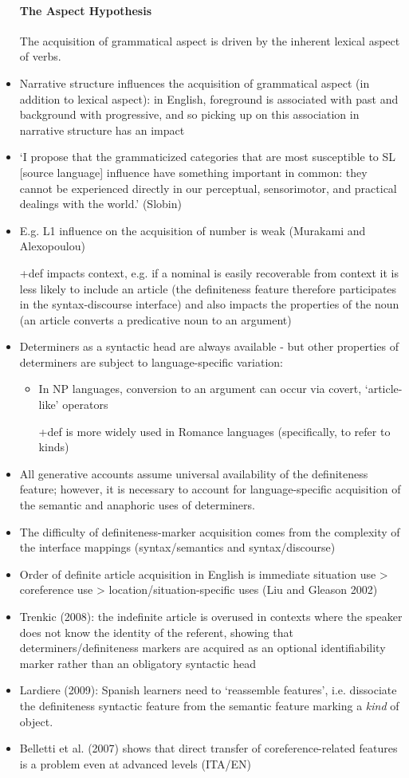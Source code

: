 \documentclass{article}
\begin{document}
\begin{itemize}
    \paragraph{The Aspect Hypothesis} The acquisition of grammatical aspect is driven by the inherent lexical aspect of verbs.
    \item Narrative structure influences the acquisition of grammatical aspect (in addition to lexical aspect): in English, foreground is associated with past and background with progressive, and so picking up on this association in narrative structure has an impact
    \item `I propose that the grammaticized categories that are most
    susceptible to SL [source language] influence have something
    important in common: they cannot be experienced directly in
    our perceptual, sensorimotor, and practical dealings with the
    world.' (Slobin) 
    \item E.g. L1 influence on the acquisition of number is weak (Murakami and Alexopoulou)
    \item [+def] impacts context, e.g. if a nominal is easily recoverable from context it is less likely to include an article (the definiteness feature therefore participates in the syntax-discourse interface) and also impacts the properties of the noun (an article converts a predicative noun to an argument)
    \item Determiners as a syntactic head are always available - but other properties of determiners are subject to language-specific variation:
    \begin{itemize}
        \item In NP languages, conversion to an argument can occur via covert, `article-like' operators
        \item [+def] is more widely used in Romance languages (specifically, to refer to kinds)
    \end{itemize}
    \item All generative accounts assume universal availability of the definiteness feature; however, it is necessary to account for language-specific acquisition of the semantic and anaphoric uses of determiners.
    \item The difficulty of definiteness-marker acquisition comes from the complexity of the interface mappings (syntax/semantics and syntax/discourse)
    \item Order of definite article acquisition in English is immediate situation use > coreference use > location/situation-specific uses (Liu and Gleason 2002)
    \item Trenkic (2008): the indefinite article is overused in contexts where the speaker does not know the identity of the referent, showing that determiners/definiteness markers are acquired as an optional identifiability marker rather than an obligatory syntactic head
    \item Lardiere (2009): Spanish learners need to `reassemble features', i.e. dissociate the definiteness syntactic feature from the semantic feature marking a \textit{kind} of object.
    \item Belletti et al. (2007) shows that direct transfer of coreference-related features is a problem even at advanced levels (ITA/EN)

\end{itemize}
\end{document}
